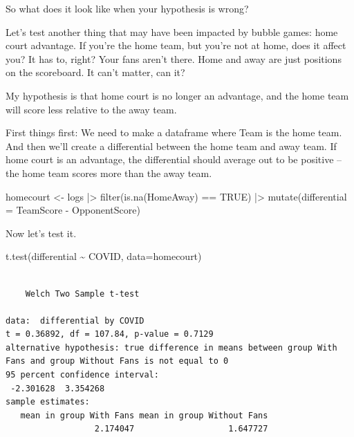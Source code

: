 \documentclass[
  letterpaper,
  DIV=11,
  numbers=noendperiod]{scrreprt}
\newenvironment{Shaded}{\begin{snugshade}}{\end{snugshade}}
\newcommand{\AttributeTok}[1]{\textcolor[rgb]{0.40,0.45,0.13}{#1}}
\newcommand{\ConstantTok}[1]{\textcolor[rgb]{0.56,0.35,0.01}{#1}}
\newcommand{\FunctionTok}[1]{\textcolor[rgb]{0.28,0.35,0.67}{#1}}
\newcommand{\NormalTok}[1]{\textcolor[rgb]{0.00,0.23,0.31}{#1}}
\newcommand{\OtherTok}[1]{\textcolor[rgb]{0.00,0.23,0.31}{#1}}
\newcommand{\SpecialCharTok}[1]{\textcolor[rgb]{0.37,0.37,0.37}{#1}}
\begin{document}
So what does it look like when your hypothesis is wrong?

Let's test another thing that may have been impacted by bubble games:
home court advantage. If you're the home team, but you're not at home,
does it affect you? It has to, right? Your fans aren't there. Home and
away are just positions on the scoreboard. It can't matter, can it?

My hypothesis is that home court is no longer an advantage, and the home
team will score less relative to the away team.

First things first: We need to make a dataframe where Team is the home
team. And then we'll create a differential between the home team and
away team. If home court is an advantage, the differential should
average out to be positive -- the home team scores more than the away
team.

\begin{Shaded}
\begin{Highlighting}[]
\NormalTok{homecourt }\OtherTok{\textless{}{-}}\NormalTok{ logs }\SpecialCharTok{|\textgreater{}} \FunctionTok{filter}\NormalTok{(}\FunctionTok{is.na}\NormalTok{(HomeAway) }\SpecialCharTok{==} \ConstantTok{TRUE}\NormalTok{) }\SpecialCharTok{|\textgreater{}} \FunctionTok{mutate}\NormalTok{(}\AttributeTok{differential =}\NormalTok{ TeamScore }\SpecialCharTok{{-}}\NormalTok{ OpponentScore)}
\end{Highlighting}
\end{Shaded}

Now let's test it.

\begin{Shaded}
\begin{Highlighting}[]
\FunctionTok{t.test}\NormalTok{(differential }\SpecialCharTok{\textasciitilde{}}\NormalTok{ COVID, }\AttributeTok{data=}\NormalTok{homecourt)}
\end{Highlighting}
\end{Shaded}

\begin{verbatim}

    Welch Two Sample t-test

data:  differential by COVID
t = 0.36892, df = 107.84, p-value = 0.7129
alternative hypothesis: true difference in means between group With Fans and group Without Fans is not equal to 0
95 percent confidence interval:
 -2.301628  3.354268
sample estimates:
   mean in group With Fans mean in group Without Fans 
                  2.174047                   1.647727 
\end{verbatim}
\end{document}
